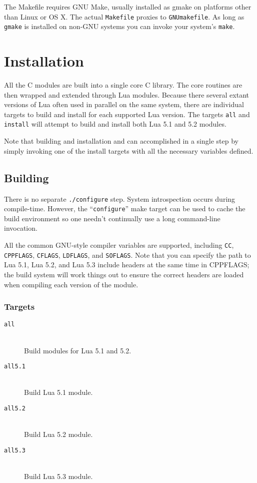 \documentclass[11pt, oneside]{memoir}
\begin{document}
The Makefile requires GNU Make, usually installed as gmake on platforms other than Linux or OS X. The actual \texttt{Makefile} proxies to \texttt{GNUmakefile}. As long as \texttt{gmake} is installed on non-GNU systems you can invoke your system's \texttt{make}.

\chapter{Installation}

All the C modules are built into a single core C library. The core routines are then wrapped and extended through Lua modules. Because there several extant versions of Lua often used in parallel on the same system, there are individual targets to build and install for each supported Lua version. The targets \texttt{all} and \texttt{install} will attempt to build and install both Lua 5.1 and 5.2 modules.

Note that building and installation and can accomplished in a single step by simply invoking one of the install targets with all the necessary variables defined.

\section{Building}

There is no separate \texttt{./configure} step. System introspection occurs during compile-time. However, the ``\texttt{configure}'' make target can be used to cache the build environment so one needn't continually use a long command-line invocation.

All the common GNU-style compiler variables are supported, including \texttt{CC}, \texttt{CPPFLAGS}, \texttt{CFLAGS}, \texttt{LDFLAGS}, and \texttt{SOFLAGS}. Note that you can specify the path to Lua 5.1, Lua 5.2, and Lua 5.3 include headers at the same time in CPPFLAGS; the build system will work things out to ensure the correct headers are loaded when compiling each version of the module.

\subsection{Targets}

\begin{description}
\item[\texttt{all}] \hfill \\
Build modules for Lua 5.1 and 5.2.

\item[\texttt{all5.1}] \hfill \\
Build Lua 5.1 module.

\item[\texttt{all5.2}] \hfill \\
Build Lua 5.2 module.

\item[\texttt{all5.3}] \hfill \\
Build Lua 5.3 module.

\end{description}
\end{document}
